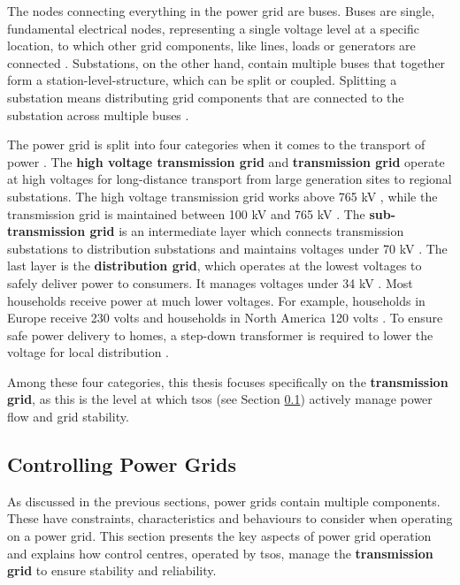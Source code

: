 The nodes connecting everything in the power grid are buses. Buses are single, fundamental electrical nodes, representing a single voltage level at a specific location, to which other grid components, like lines, loads or generators are connected \cite{pandapower}. Substations, on the other hand, contain multiple buses that together form a station-level-structure, which can be split or coupled. Splitting a substation means distributing grid components that are connected to the substation across multiple buses \cite{pptopogym}.

The power grid is split into four categories when it comes to the transport of power \cite{us_elec_industry_primer}. 
The \textbf{high voltage transmission grid} and \textbf{transmission grid} operate at high voltages for long-distance transport from large generation sites to regional substations. The high voltage transmission grid works above 765 kV \cite{us_elec_industry_primer}, while the transmission grid is maintained between 100 kV and 765 kV \cite{grl4powergrids}.
The \textbf{sub-transmission grid} is an intermediate layer which connects transmission substations to distribution substations and maintains voltages under 70 kV \cite{us_elec_industry_primer}.
The last layer is the \textbf{distribution grid}, which operates at the lowest voltages to safely deliver power to consumers. It manages voltages under 34 kV \cite{us_elec_industry_primer}. Most households receive power at much lower voltages. For example, households in Europe receive 230 volts and households in North America 120 volts \cite{rl4network_operation}. To ensure safe power delivery to homes, a step-down transformer is required to lower the voltage for local distribution \cite{rl4network_operation}.

Among these four categories, this thesis focuses specifically on the \textbf{transmission grid}, as this is the level at which \acp{tso} (see Section \ref{ssec:ctrl-power-grids}) actively manage power flow and grid stability.


\subsection{Controlling Power Grids}\label{ssec:ctrl-power-grids}
As discussed in the previous sections, power grids contain multiple components. These have constraints, characteristics and behaviours to consider when operating on a power grid. This section presents the key aspects of power grid operation and explains how control centres, operated by \acp{tso}, manage the \textbf{transmission grid} to ensure stability and reliability.


